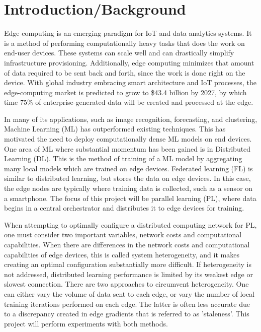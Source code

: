 \documentclass[../mthe-493-project-proposal.tex]{subfiles}
\begin{document}
    \chapter{Introduction/Background}
    \label{ch:introduction}

    Edge computing is an emerging paradigm for IoT and data analytics systems. It is a method of performing computationally heavy tasks that does the work on end-user devices. These systems can scale well and can drastically simplify infrastructure provisioning. Additionally, edge computing minimizes that amount of data required to be sent back and forth, since the work is done right on the device. With global industry embracing smart architecture and IoT processes, the edge-computing market is predicted to grow to \$43.4 billion by 2027, by which time 75\% of enterprise-generated data will be created and processed at the edge.~\cite{noauthor_edge_2020}

    In many of its applications, such as image recognition, forecasting, and clustering, Machine Learning (ML) has outperformed existing techniques. This has motivated the need to deploy computationally dense ML models on end devices. One area of ML where substantial momentum has been gained is in Distributed Learning (DL). This is the method of training of a ML model by aggregating many local models which are trained on edge devices. Federated learning (FL) is similar to distributed learning, but stores the data on edge devices. In this case, the edge nodes are typically where training data is collected, such as a sensor on a smartphone. The focus of this project will be parallel learning (PL), where data begins in a central orchestrator and distributes it to edge devices for training.

    When attempting to optimally configure a distributed computing network for PL, one must consider two important variables, network costs and computational capabilities. When there are differences in the network costs and computational capabilities of edge devices, this is called system heterogeneity, and it makes creating an optimal configuration substantially more difficult. If heterogeneity is not addressed, distributed learning performance is limited by its weakest edge or slowest connection. There are two approaches to circumvent heterogeneity. One can either vary the volume of data sent to each edge, or vary the number of local training iterations performed on each edge. The latter is often less accurate due to a discrepancy created in edge gradients that is referred to as 'staleness'. This project will perform experiments with both methods.
\end{document}
